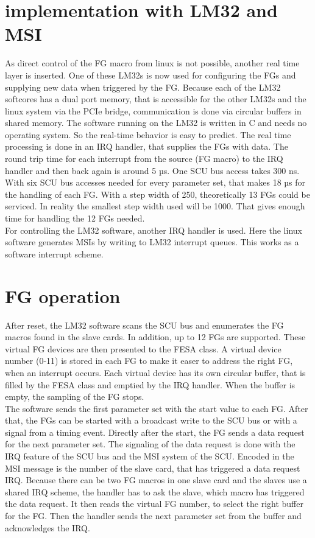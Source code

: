 \documentclass[a4paper,
              ]{jacow}
\begin{document}
\section{implementation with LM32 and MSI}
As direct control of the FG macro from linux is not possible, another real time layer is inserted. 
One of these LM32s is now used for configuring the FGs and supplying new data when triggered by the FG.
Because each of the LM32 softcores has a dual port memory, that is accessible for the other LM32s and the linux system via the PCIe bridge, communication is done via circular buffers in shared memory. The software running on the LM32 is written in C and needs no operating system. So the real-time behavior is easy to predict. The real time processing is done in an IRQ handler, that supplies the FGs with data. The round trip time for each interrupt from the source (FG macro) to the IRQ handler and then back again is around 5 µs. One SCU bus access takes 300 ns. With six SCU bus accesses needed for every parameter set, that makes 18 µs for the handling of each FG. With a step width of 250, theoretically 13 FGs could be serviced. In reality the smallest step width used will be 1000. That gives enough time for handling the 12 FGs needed.\\
For controlling the LM32 software, another IRQ handler is used. Here the linux software generates MSIs by writing to LM32 interrupt queues. This works as a software interrupt scheme.

\section{FG operation}
After reset, the LM32 software scans the SCU bus and enumerates the FG macros found in the slave cards. In addition, up to 12 FGs are supported. These virtual FG devices are then presented to the FESA class. A virtual device number (0-11) is stored in each FG to make it easer to address the right FG, when an interrupt occurs.
Each virtual device has its own circular buffer, that is filled by the FESA class and emptied by the IRQ handler.
When the buffer is empty, the sampling of the FG stops.\\
The software sends the first parameter set with the start value to each FG. After that, the FGs can be started with a broadcast write to the SCU bus or with a signal from a timing event. Directly after the start, the FG sends a data request for the next parameter set. The signaling of the data request is done with the IRQ feature of the SCU bus and the MSI system of the SCU. Encoded in the MSI message is the number of the slave card, that has triggered a data request IRQ. Because there can be two FG macros in one slave card and the slaves use a shared IRQ scheme, the handler has to ask the slave, which macro has triggered the data request. It then reads the virtual FG number, to select the right buffer for the FG. Then the handler sends the next parameter set from the buffer and acknowledges the IRQ.
\end{document}
